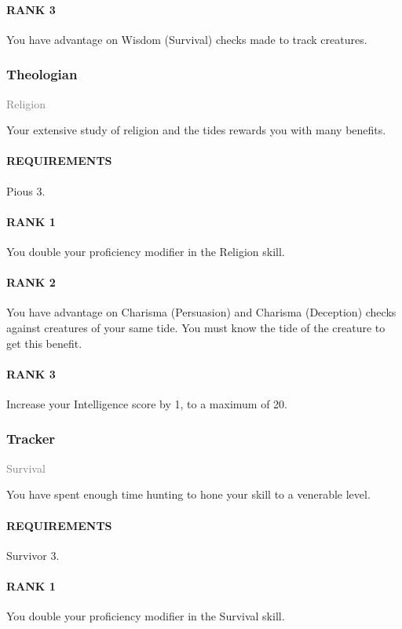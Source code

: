 \paragraph{RANK 3} You have advantage on Wisdom (Survival) checks made to track creatures.

\subsubsection{Theologian} \label{feat::theologian}
\small{\textcolor{gray}{Religion}}

\normalsize
Your extensive study of religion and the tides rewards you with many benefits.
\paragraph{REQUIREMENTS} Pious 3.
\paragraph{RANK 1} You double your proficiency modifier in the Religion skill.
\paragraph{RANK 2} You have advantage on Charisma (Persuasion) and Charisma (Deception) checks against creatures of your same tide.
You must know the tide of the creature to get this benefit.
\paragraph{RANK 3} Increase your Intelligence score by 1, to a maximum of 20.

\subsubsection{Tracker} \label{feat::tracker}
\small{\textcolor{gray}{Survival}}

\normalsize
You have spent enough time hunting to hone your skill to a venerable level.
\paragraph{REQUIREMENTS} Survivor 3.
\paragraph{RANK 1} You double your proficiency modifier in the Survival skill.
